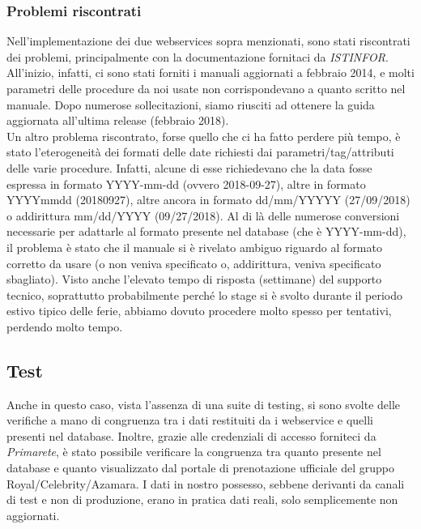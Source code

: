 \subsubsection{Problemi riscontrati}
Nell'implementazione dei due \glspl{webservice} sopra menzionati, sono stati riscontrati dei problemi, principalmente con la documentazione fornitaci da \textit{ISTINFOR}. All'inizio, infatti, ci sono stati forniti i manuali aggiornati a febbraio 2014, e molti parametri delle procedure da noi usate non corrispondevano a quanto scritto nel manuale. Dopo numerose sollecitazioni, siamo riusciti ad ottenere la guida aggiornata all'ultima release (febbraio 2018).\\
Un altro problema riscontrato, forse quello che ci ha fatto perdere più tempo, è stato l'eterogeneità dei formati delle date richiesti dai parametri/tag/attributi delle varie procedure. Infatti, alcune di esse richiedevano che la data fosse espressa in formato YYYY-mm-dd (ovvero 2018-09-27), altre in formato YYYYmmdd (20180927), altre ancora in formato dd/mm/YYYYY (27/09/2018) o addirittura mm/dd/YYYY (09/27/2018). Al di là delle numerose conversioni necessarie per adattarle al formato presente nel database (che è YYYY-mm-dd), il problema è stato che il manuale si è rivelato ambiguo riguardo al formato corretto da usare (o non veniva specificato o, addirittura, veniva specificato sbagliato). Visto anche l'elevato tempo di risposta (settimane) del supporto tecnico, soprattutto probabilmente perché lo stage si è svolto durante il periodo estivo tipico delle ferie, abbiamo dovuto procedere molto spesso per tentativi, perdendo molto tempo.

\subsection{Test}
Anche in questo caso, vista l'assenza di una suite di testing, si sono svolte delle verifiche a mano di congruenza tra i dati restituiti da i \gls{webservice} e quelli presenti nel database. Inoltre, grazie alle credenziali di accesso forniteci da \textit{Primarete}, è stato possibile verificare la congruenza tra quanto presente nel database e quanto visualizzato dal portale di prenotazione ufficiale del gruppo Royal/Celebrity/Azamara. I dati in nostro possesso, sebbene derivanti da canali di test e non di produzione, erano in pratica dati reali, solo semplicemente non aggiornati.
